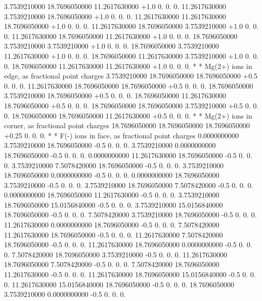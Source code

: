 \begin{inputlisting}
   3.7539210000  18.7696050000  11.2617630000        +1.0  0.  0.  0.
  11.2617630000   3.7539210000  18.7696050000        +1.0  0.  0.  0.
  11.2617630000  11.2617630000  18.7696050000        +1.0  0.  0.  0.
  11.2617630000  18.7696050000   3.7539210000        +1.0  0.  0.  0.
  11.2617630000  18.7696050000  11.2617630000        +1.0  0.  0.  0.
  18.7696050000   3.7539210000   3.7539210000        +1.0  0.  0.  0.
  18.7696050000   3.7539210000  11.2617630000        +1.0  0.  0.  0.
  18.7696050000  11.2617630000   3.7539210000        +1.0  0.  0.  0.
  18.7696050000  11.2617630000  11.2617630000        +1.0  0.  0.  0.
*
* Mg(2+) ions in edge, as fractional point charges
   3.7539210000  18.7696050000  18.7696050000     +0.5  0.  0.  0.
  11.2617630000  18.7696050000  18.7696050000     +0.5  0.  0.  0.
  18.7696050000   3.7539210000  18.7696050000     +0.5  0.  0.  0.
  18.7696050000  11.2617630000  18.7696050000     +0.5  0.  0.  0.
  18.7696050000  18.7696050000   3.7539210000     +0.5  0.  0.  0.
  18.7696050000  18.7696050000  11.2617630000     +0.5  0.  0.  0.
*
* Mg(2+) ions in corner, as fractional point charges
  18.7696050000  18.7696050000  18.7696050000      +0.25  0. 0. 0.
*
* F(-) ions in face, as fractional point charges
   0.0000000000   3.7539210000  18.7696050000       -0.5  0. 0. 0.
   3.7539210000   0.0000000000  18.7696050000       -0.5  0. 0. 0.
   0.0000000000  11.2617630000  18.7696050000       -0.5  0. 0. 0.
   3.7539210000   7.5078420000  18.7696050000       -0.5  0. 0. 0.
   3.7539210000  18.7696050000   0.0000000000       -0.5  0. 0. 0.
   0.0000000000  18.7696050000   3.7539210000       -0.5  0. 0. 0.
   3.7539210000  18.7696050000   7.5078420000       -0.5  0. 0. 0.
   0.0000000000  18.7696050000  11.2617630000       -0.5  0. 0. 0.
   3.7539210000  18.7696050000  15.0156840000       -0.5  0. 0. 0.
   3.7539210000  15.0156840000  18.7696050000       -0.5  0. 0. 0.
   7.5078420000   3.7539210000  18.7696050000       -0.5  0. 0. 0.
  11.2617630000   0.0000000000  18.7696050000       -0.5  0. 0. 0.
   7.5078420000  11.2617630000  18.7696050000       -0.5  0. 0. 0.
  11.2617630000   7.5078420000  18.7696050000       -0.5  0. 0. 0.
  11.2617630000  18.7696050000   0.0000000000       -0.5  0. 0. 0.
   7.5078420000  18.7696050000   3.7539210000       -0.5  0. 0. 0.
  11.2617630000  18.7696050000   7.5078420000       -0.5  0. 0. 0.
   7.5078420000  18.7696050000  11.2617630000       -0.5  0. 0. 0.
  11.2617630000  18.7696050000  15.0156840000       -0.5  0. 0. 0.
  11.2617630000  15.0156840000  18.7696050000       -0.5  0. 0. 0.
  18.7696050000   3.7539210000   0.0000000000       -0.5  0. 0. 0.

\end{inputlisting}
